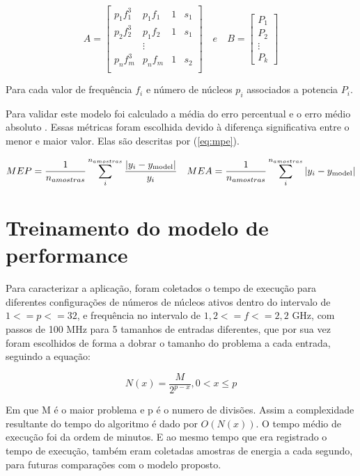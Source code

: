 \begin{equation}
A=
\begin{bmatrix}
p_1f_1^3 & p_1f_1 & 1 & s_1 \\
p_2f_2^3 & p_1f_2 & 1 & s_1 \\
& \vdots \\
p_nf_m^3 & p_nf_m & 1 & s_2 \\
\end{bmatrix}
\quad e\quad B= 
\begin{bmatrix}
P_1 \\
P_2 \\
\vdots \\
P_k
\end{bmatrix}
\end{equation}

Para cada valor de frequência $f_i$ e número de núcleos $p_i$ associados a potencia $P_i$.

Para validar este modelo foi calculado a média do erro percentual  e o erro médio absoluto . Essas métricas foram escolhida devido à diferença significativa entre o menor e maior valor. Elas são descritas por (\ref{eq:mpe}).

\begin{equation}
MEP=\frac{1}{n_{amostras}}\sum_{i}^{n_{amostras}}{\frac{|y_i-y_{\rm model}|}{y_i}} \quad MEA=\frac{1}{n_{amostras}}\sum_{i}^{n_{amostras}}{|y_i-y_{\rm model}|}
\label{eq:mpe}
\end{equation}


\section{Treinamento do modelo de performance} \label{sec:met_ajuste_perf}

Para caracterizar a aplicação, foram coletados o tempo de execução para diferentes configurações de números de núcleos ativos dentro do intervalo de $ 1 <= p <= 32 $, e frequência no intervalo de $ 1,2 <= f <= 2,2 $ GHz, com passos de 100 MHz para 5 tamanhos de entradas diferentes, que por sua vez foram escolhidos de forma a dobrar o tamanho do problema a cada entrada, seguindo a equação:

\begin{equation}
N(x)=\frac{M}{2^{p-x}}, 0<x\leq p
\end{equation}

Em que M é o maior problema e p é o numero de divisões. Assim a complexidade resultante do tempo do algoritmo é dado por $O(N(x))$. O tempo médio de execução foi da ordem de minutos. E ao mesmo tempo que era registrado o tempo de execução, também eram coletadas amostras de energia a cada segundo, para futuras comparações com o modelo proposto.

